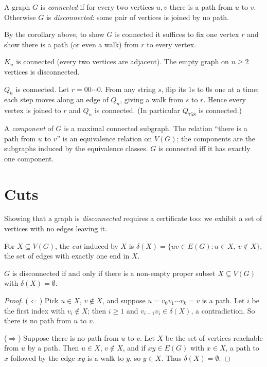 \begin{definition}[Connected]
A graph $G$ is \emph{connected} if for every two vertices $u, v$ there is a path from $u$ to $v$.
Otherwise $G$ is \emph{disconnected}: some pair of vertices is joined by no path.
\end{definition}

By the corollary above, to show $G$ is connected it suffices to fix one vertex $r$ and show
there is a path (or even a walk) from $r$ to every vertex.

\begin{example}
$K_n$ is connected (every two vertices are adjacent). The empty graph on $n \ge 2$ vertices is
disconnected.
\end{example}

\begin{example}
$Q_n$ is connected. Let $r = 00\cdots0$. From any string $s$, flip its $1$s to $0$s one at a
time; each step moves along an edge of $Q_n$, giving a walk from $s$ to $r$. Hence every vertex
is joined to $r$ and $Q_n$ is connected. (In particular $Q_{758}$ is connected.)
\end{example}

\begin{definition}[Component]
A \emph{component} of $G$ is a maximal connected subgraph. The relation ``there is a path from
$u$ to $v$'' is an equivalence relation on $V(G)$; the components are the subgraphs induced by
the equivalence classes. $G$ is connected iff it has exactly one component.
\end{definition}

\section{Cuts}

Showing that a graph is \emph{disconnected} requires a certificate too: we exhibit a set of
vertices with no edges leaving it.

\begin{definition}[Cut]
For $X \subseteq V(G)$, the \emph{cut} induced by $X$ is
$\delta(X) = \{uv \in E(G) : u \in X,\ v \notin X\}$, the set of edges with exactly one end in $X$.
\end{definition}

\begin{theorem}
$G$ is disconnected if and only if there is a non-empty proper subset $X \subsetneq V(G)$ with
$\delta(X) = \emptyset$.
\end{theorem}
\begin{proof}
($\Leftarrow$) Pick $u \in X$, $v \notin X$, and suppose $u = v_0v_1\cdots v_k = v$ is a path.
Let $i$ be the first index with $v_i \notin X$; then $i \ge 1$ and $v_{i-1}v_i \in \delta(X)$,
a contradiction. So there is no path from $u$ to $v$.

($\Rightarrow$) Suppose there is no path from $u$ to $v$. Let $X$ be the set of vertices reachable
from $u$ by a path. Then $u \in X$, $v\notin X$, and if $xy \in E(G)$ with $x \in X$, a path to $x$
followed by the edge $xy$ is a walk to $y$, so $y \in X$. Thus $\delta(X) = \emptyset$.
\end{proof}

